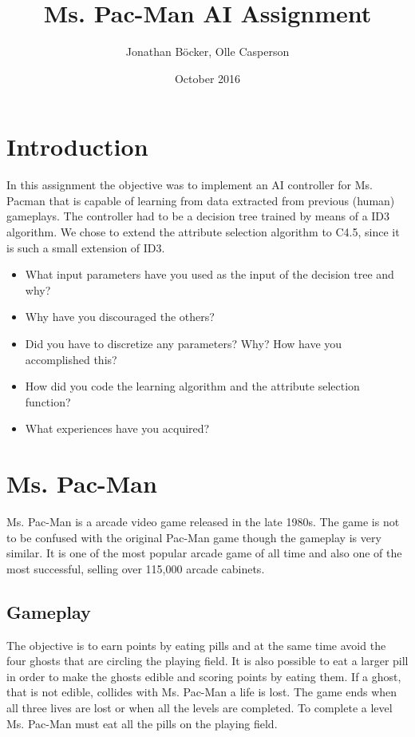 \documentclass{article}
\title{Ms. Pac-Man AI Assignment}
\author{Jonathan Böcker, Olle Casperson }
\date{October 2016}
\begin{document}
\maketitle

\section{Introduction}
In this assignment the objective was to implement an AI controller for Ms. Pacman that is capable of learning from data extracted from previous (human) gameplays. The controller had to be a decision tree
trained by means of a ID3 algorithm\citep{russel2010artifical}. We chose to extend the attribute selection algorithm to C4.5\citep{russel2010artifical}, since it is such a small extension of ID3.

\iffalse  %
\begin{itemize}
    \item What input parameters have you used as the input of the decision tree and why?
    \item Why have you discouraged the others?
    \item Did you have to discretize any parameters? Why? How have you accomplished this?
    \item How did you code the learning algorithm and the attribute selection function?
    \item What experiences have you acquired?
\end{itemize}

\section{Ms. Pac-Man}
Ms. Pac-Man is a arcade video game released in the late 1980s. The game is not to be confused with the original Pac-Man game though the gameplay is very similar. It is one of the most popular arcade game of all time and also one of the most successful, selling over 115,000 arcade cabinets.  \citep{mspacmanwiki}

    \subsection{Gameplay}
    The objective is to earn points by eating pills and at the same time avoid the four ghosts that are circling the playing field. It is also possible to eat a larger pill in order to make the ghosts edible and scoring points by eating them. If a ghost, that is not edible, collides with Ms. Pac-Man a life is lost. The game ends when all three lives are lost or when all the levels are completed. To complete a level Ms. Pac-Man must eat all the pills on the playing field.
\end{document}
